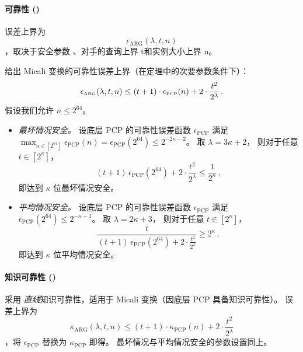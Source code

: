 \documentclass[american,singlepageview]{snargs-book-zh}
\renewcommand{\enspace}{\ensuremath{\thinspace}}
\newcommand{\InstanceSize}{n}
\newcommand{\ProtoSoundnessError}{\epsilon}
\newcommand{\ProtoKnowledgeError}{\kappa}
\newcommand{\PCPSubscript}{\scriptscriptstyle\mathrm{PCP}}
\newcommand{\PCPSoundnessError}{\ProtoSoundnessError_{\PCPSubscript}}
\newcommand{\PCPKnowledgeError}{\ProtoKnowledgeError_{\PCPSubscript}}
\newcommand{\ARGSubscript}{\scriptscriptstyle\mathrm{ARG}}
\newcommand{\ARGSoundnessError}{\ProtoSoundnessError_{\ARGSubscript}}
\newcommand{\ARGKnowledgeError}{\ProtoKnowledgeError_{\ARGSubscript}}
\newcommand{\ROQueryBound}{t}
\newcommand{\SecurityParameter}{\lambda}
\newcommand{\SecurityLevel}{\kappa}
\newcommand{\MTMultiExtractabilityShortExpression}[2]{2 \cdot \frac{#2^2}{2^{#1}}}
\begin{document}
\paragraph{可靠性 ()}  
误差上界为 
\[
\ARGSoundnessError(\SecurityParameter,\ROQueryBound,\InstanceSize)
\]
，取决于安全参数 \SecurityParameter、对手的查询上界 \ROQueryBound 和实例大小上界 \InstanceSize。

 给出 Micali 变换的可靠性误差上界（在定理中的次要参数条件下）：
\[
\ARGSoundnessError(\SecurityParameter,\ROQueryBound,\InstanceSize)
\le(\ROQueryBound+1)\cdot\PCPSoundnessError(\InstanceSize)
+\MTMultiExtractabilityShortExpression{\SecurityParameter}{\ROQueryBound}
\enspace.
\]
假设我们允许 $\InstanceSize\le2^{64}$。
\begin{itemize}[noitemsep]
  \item \emph{最坏情况安全。}  
    设底层 PCP 的可靠性误差函数 $\PCPSoundnessError$ 满足
    \(\max_{\InstanceSize\in[2^{64}]}\PCPSoundnessError(\InstanceSize)
      =\PCPSoundnessError(2^{64})\le2^{-2\SecurityLevel-2}\)。  
    取 \(\SecurityParameter=3\SecurityLevel+2\)，
    则对于任意 \(\ROQueryBound\in[2^{\SecurityLevel}]\)，
    \[
      (\ROQueryBound+1)\,\PCPSoundnessError(2^{64})
      +\MTMultiExtractabilityShortExpression{\SecurityParameter}{\ROQueryBound}
      \le\frac{1}{2^{\SecurityLevel}}
      \,,
    \]
    即达到 $\SecurityLevel$ 位最坏情况安全。

  \item \emph{平均情况安全。}  
    设底层 PCP 的可靠性误差函数 $\PCPSoundnessError$ 满足
    \(\PCPSoundnessError(2^{64})\le2^{-\SecurityLevel-1}\)。  
    取 \(\SecurityParameter=2\SecurityLevel+3\)，
    则对于任意 \(\ROQueryBound\in[2^{\SecurityLevel}]\)，
    \[
      \frac{\ROQueryBound}
      {(\ROQueryBound+1)\,\PCPSoundnessError(2^{64})
       +\MTMultiExtractabilityShortExpression{\SecurityParameter}{\ROQueryBound}}
      \ge2^{\SecurityLevel}
      \,,
    \]
    即达到 $\SecurityLevel$ 位平均情况安全。
\end{itemize}

\paragraph{知识可靠性 ()}  
采用 \emph{直线}知识可靠性，适用于 Micali 变换（因底层 PCP 具备知识可靠性）。  
误差上界为 
\[
\ARGKnowledgeError(\SecurityParameter,\ROQueryBound,\InstanceSize)
\le(\ROQueryBound+1)\cdot\PCPKnowledgeError(\InstanceSize)
+\MTMultiExtractabilityShortExpression{\SecurityParameter}{\ROQueryBound}
\]
，将 $\PCPSoundnessError$ 替换为 $\PCPKnowledgeError$ 即得。  
最坏情况与平均情况安全的参数设置同上。
\end{document}
